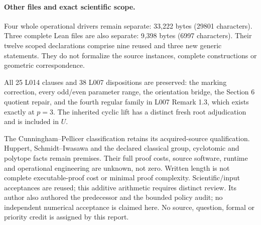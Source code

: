 \documentclass[11pt,a4paper]{article}
\begin{document}
\paragraph{Other files and exact scientific scope.}
Four whole operational drivers remain separate: 33,222 bytes (29801
characters). Three complete Lean files are also separate: 9,398 bytes
(6997 characters). Their twelve scoped declarations comprise nine reused
and three new generic statements. They do not formalize the source instances,
complete constructions or geometric correspondence.

All 25 L014 clauses and 38 L007 dispositions are preserved: the marking
correction, every odd/even parameter range, the orientation bridge, the
Section 6 quotient repair, and the fourth regular family in L007 Remark 1.3,
which exists exactly at $p=3$. The inherited cyclic lift has a distinct fresh
root adjudication and is included in $U$.

The Cunningham--Pellicer classification retains its acquired-source
qualification. Huppert, Schmidt--Iwasawa and the declared classical group,
cyclotomic and polytope facts remain premises. Their full proof costs,
source software, runtime and operational engineering are unknown, not zero.
Written length is not complete executable-proof cost or minimal proof
complexity. Scientific/input acceptances are reused; this additive arithmetic
requires distinct review. Its author also authored the predecessor and the
bounded policy audit; no independent numerical acceptance is claimed here.
No source, question, formal or priority credit is assigned by this report.
\end{document}
